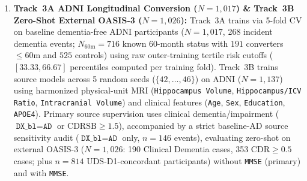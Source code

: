 \documentclass[10pt,twocolumn]{article}
\begin{document}
\begin{enumerate}[leftmargin=1.4em,itemsep=1pt,topsep=2pt]
    A$\beta^-$, 51 A$\beta^+$), Unmeasured Baseline eGFR ($n=194$), and exploratory Baseline
    Low eGFR ($<60\text{ mL/min/1.73m}^2$, $n=22$: 6 A$\beta^-$, 16 A$\beta^+$).
    One baseline measurement cannot establish the $\ge 3$-month KDIGO chronicity criterion
    for a clinical CKD diagnosis or exclude albuminuria. Real-world biomarker discordance
    ($n=198$ discordant vs.\ $n=914$ concordant across $N=1,112$ deduplicated ADNI plasma
    participants) is audited using raw outer-training 80th/85th-percentile referral cutoffs
    in Table~\ref{tab:external_ckd}. Table~\ref{tab:matched_coverage} instead uses a nested
    outer-training mid-rank empirical cumulative distribution function (ECDF):
    \[
    \widehat{F}_f(s) = \frac{1}{2\,|\mathcal{D}_f^{\text{cal}}|}
    \sum_{j \in \mathcal{D}_f^{\text{cal}}}
    \Big[\mathbb{I}(s_{f,j} < s) + \mathbb{I}(s_{f,j} \le s)\Big].
    \]
    Here $\mathcal{D}_f^{\text{cal}}$ contains fold-$f$ outer-training discordant in-sample
    predictions, with discordance defined using fold-$f$ training medians; fewer than five
    discordant cases trigger a fallback to the full training fold. Percentiles are mapped
    out-of-fold to held-out Cohort~1 and non-overlapping Cohort~2 discordant patients, then
    sorted across the pooled $n=198$ with raw-score tie-breaking.
    \item \textbf{Track~3A ADNI Longitudinal Conversion ($N=1,017$) \& Track~3B Zero-Shot
    External OASIS-3 ($N=1,026$):} Track~3A trains via 5-fold CV on baseline dementia-free ADNI
    participants ($N=1,017$, 268 incident dementia events; $N_{60\text{m}}=716$ known 60-month
    status with $191$ converters $\le 60$m and $525$ controls) using raw outer-training tertile
    risk cutoffs ($[33.33, 66.67]$ percentiles computed per training fold). Track~3B trains
    source models across 5 random seeds ($\{42,\dots,46\}$) on ADNI ($N=1,137$) using
    harmonized physical-unit MRI (\texttt{Hippocampus Volume}, \texttt{Hippocampus/ICV Ratio},
    \texttt{Intracranial Volume}) and clinical features (\texttt{Age}, \texttt{Sex},
    \texttt{Education}, \texttt{APOE4}). Primary source supervision uses clinical
    dementia/impairment ($\texttt{DX\_bl}=\texttt{AD}$ or $\text{CDRSB}\ge 1.5$), accompanied
    by a strict baseline-AD source sensitivity audit ($\texttt{DX\_bl}=\texttt{AD}$ only,
    $n=146$ events), evaluating zero-shot on external OASIS-3 ($N=1,026$: 190 Clinical Dementia
    cases, 353 $\text{CDR}\ge 0.5$ cases; plus $n=814$ UDS-D1-concordant participants)
    \cite{lamontagne2019oasis} without \texttt{MMSE} (primary) and with \texttt{MMSE}.

\end{enumerate}
\end{document}
